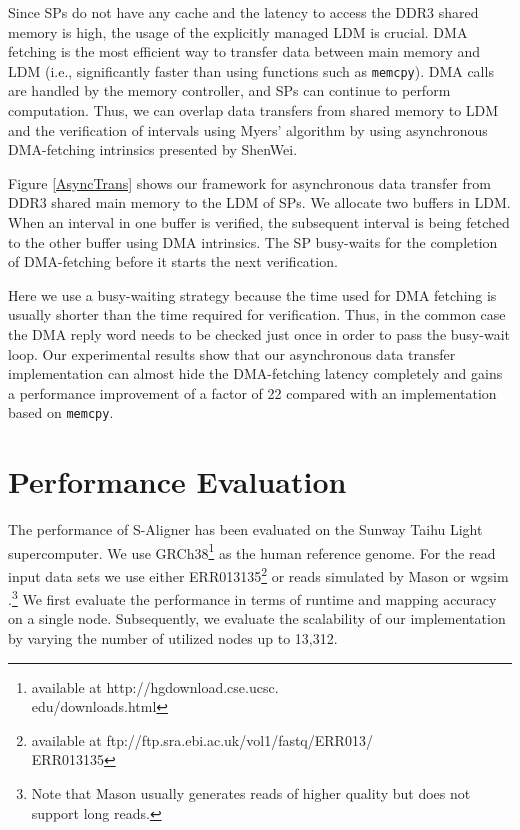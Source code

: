 \documentclass[conference]{IEEEtran}
\begin{document}
Since SPs do not have any cache and the latency to access the DDR3 shared memory is high, the usage of the explicitly managed LDM is crucial.  DMA fetching is the most efficient way to transfer data between main memory and LDM (i.e., significantly faster than using functions such as \texttt{memcpy}). DMA calls are handled by the memory controller, and SPs can continue to perform computation. Thus, we can overlap data transfers from shared memory to LDM and the verification of intervals using Myers' algorithm by using asynchronous DMA-fetching intrinsics presented by ShenWei.

Figure \ref{AsyncTrans} shows our framework for asynchronous data transfer from DDR3 shared main memory to the LDM of SPs. We allocate two buffers in LDM. When an interval in one buffer is verified, the subsequent interval is being fetched to the other buffer using DMA intrinsics. The SP busy-waits for the completion of DMA-fetching before it starts the next verification.

Here we use a busy-waiting strategy because the time used for DMA fetching is usually shorter than the time required for verification. Thus, in the common case the DMA reply word needs to be checked just once in order to pass the busy-wait loop. Our experimental results show that our asynchronous data transfer implementation can almost hide the DMA-fetching latency completely and gains a performance improvement of a factor of 22 compared with an implementation based on \texttt{memcpy}.

\section{Performance Evaluation}
\label{Evaluation}
The performance of S-Aligner has been evaluated on the Sunway Taihu Light supercomputer. We use GRCh38\footnote{available at http://hgdownload.cse.ucsc.\\edu/downloads.html} as the human reference genome.  For the read input data sets we use either ERR013135\footnote{available at ftp://ftp.sra.ebi.ac.uk/vol1/fastq/ERR013/\\ERR013135} or reads simulated by Mason \cite{mason} or wgsim \cite{wgsim}.\footnote{Note that Mason usually generates reads of higher quality but does not support long reads.}  We first evaluate the performance in terms of runtime and mapping accuracy on a single node. Subsequently, we evaluate the scalability of our implementation by varying the number of utilized nodes up to 13,312.  
\end{document}
